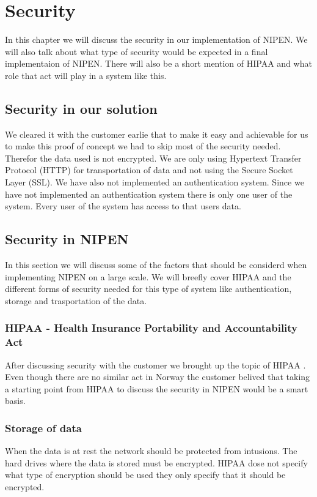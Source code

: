 \chapter{Security} 
\label{Security}


In this chapter we will discuss the security in our implementation of NIPEN.
We will also talk about what type of security would be expected in a final implementaion of NIPEN. There will also be a short mention of HIPAA and what role that act will play in a system like this.

\section{Security in our solution}
We cleared it with the customer earlie that to make it easy and achievable for us to make this proof of concept we had to skip most of the security needed.
Therefor the data used is not encrypted. 
We are only using Hypertext Transfer Protocol (HTTP) for transportation of data and not using the Secure Socket Layer (SSL).  
We have also not implemented an authentication system.
Since we have not implemented an authentication system there is only one user of the system.
Every user of the system has access to that users data.

\section{Security in NIPEN}

In this section we will discuss some of the factors that should be considerd when implementing NIPEN on a large scale.
We will breefly cover HIPAA and the different forms of security needed for this type of system like authentication, storage and trasportation of the data.


\subsection{HIPAA - Health Insurance Portability and Accountability Act}

After discussing security with the customer we brought up the topic of HIPAA \cite{HIPAA}. 
Even though there are no similar act in Norway the customer belived that taking a starting point from HIPAA to discuss the security in NIPEN would be a smart basis. 

\subsection{Storage of data}
When the data is at rest the network should be protected from intusions.
The hard drives where the data is stored must be encrypted. \cite{Encryption}
HIPAA dose not specify what type of encryption should be used they only specify that it should be encrypted.

